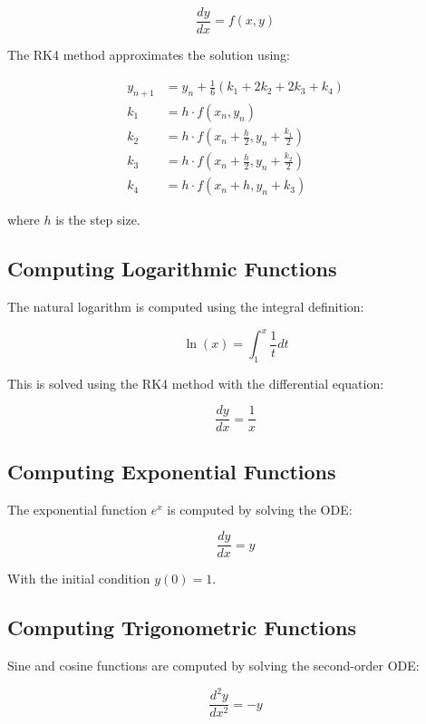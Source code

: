 \documentclass[12pt,a4paper]{article}
\begin{document}
\begin{equation}
\frac{dy}{dx} = f(x, y)
\end{equation}

The RK4 method approximates the solution using:

\begin{align}
y_{n+1} &= y_n + \frac{1}{6}(k_1 + 2k_2 + 2k_3 + k_4) \\
k_1 &= h \cdot f(x_n, y_n) \\
k_2 &= h \cdot f(x_n + \frac{h}{2}, y_n + \frac{k_1}{2}) \\
k_3 &= h \cdot f(x_n + \frac{h}{2}, y_n + \frac{k_2}{2}) \\
k_4 &= h \cdot f(x_n + h, y_n + k_3)
\end{align}

where $h$ is the step size.

\subsection{Computing Logarithmic Functions}
The natural logarithm is computed using the integral definition:

\begin{equation}
\ln(x) = \int_{1}^{x} \frac{1}{t} dt
\end{equation}

This is solved using the RK4 method with the differential equation:

\begin{equation}
\frac{dy}{dx} = \frac{1}{x}
\end{equation}

\subsection{Computing Exponential Functions}
The exponential function $e^x$ is computed by solving the ODE:

\begin{equation}
\frac{dy}{dx} = y
\end{equation}

With the initial condition $y(0) = 1$.

\subsection{Computing Trigonometric Functions}
Sine and cosine functions are computed by solving the second-order ODE:

\begin{equation}
\frac{d^2y}{dx^2} = -y
\end{equation}
\end{document}
